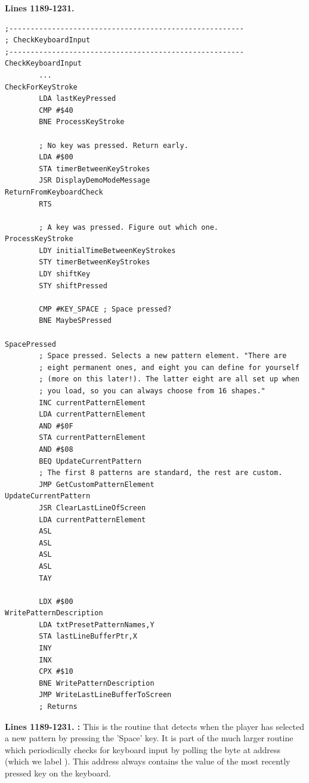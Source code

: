 \clearpage
\textbf{Lines 1189-1231. } 
\begin{lstlisting}[basicstyle=\ttfamily\scriptsize]
;-------------------------------------------------------
; CheckKeyboardInput
;-------------------------------------------------------
CheckKeyboardInput   
        ...
CheckForKeyStroke   
        LDA lastKeyPressed
        CMP #$40
        BNE ProcessKeyStroke

        ; No key was pressed. Return early.
        LDA #$00
        STA timerBetweenKeyStrokes
        JSR DisplayDemoModeMessage
ReturnFromKeyboardCheck   
        RTS 

        ; A key was pressed. Figure out which one.
ProcessKeyStroke   
        LDY initialTimeBetweenKeyStrokes
        STY timerBetweenKeyStrokes
        LDY shiftKey
        STY shiftPressed

        CMP #KEY_SPACE ; Space pressed?
        BNE MaybeSPressed

SpacePressed
        ; Space pressed. Selects a new pattern element. "There are
        ; eight permanent ones, and eight you can define for yourself
        ; (more on this later!). The latter eight are all set up when
        ; you load, so you can always choose from 16 shapes."
        INC currentPatternElement
        LDA currentPatternElement
        AND #$0F
        STA currentPatternElement
        AND #$08
        BEQ UpdateCurrentPattern
        ; The first 8 patterns are standard, the rest are custom.
        JMP GetCustomPatternElement
UpdateCurrentPattern   
        JSR ClearLastLineOfScreen
        LDA currentPatternElement
        ASL 
        ASL 
        ASL 
        ASL 
        TAY 

        LDX #$00
WritePatternDescription   
        LDA txtPresetPatternNames,Y
        STA lastLineBufferPtr,X
        INY 
        INX 
        CPX #$10
        BNE WritePatternDescription
        JMP WriteLastLineBufferToScreen
        ; Returns
\end{lstlisting}
\clearpage

\textbf{Lines 1189-1231. :} This is the routine that detects when the player has selected a new
pattern by pressing the 'Space' key. It is part of the much larger routine  which periodically checks
for keyboard input by polling the byte at address  (which we label ). This address always
contains the value of the most recently pressed key on the keyboard.

